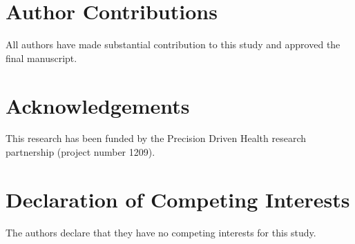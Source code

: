 \documentclass{elsarticle}
\begin{document}
\section*{Author Contributions}
All authors have made substantial contribution to this study and approved the final manuscript.

\section*{Acknowledgements}
This research has been funded by the Precision Driven Health research partnership (project number 1209).

\section*{Declaration of Competing Interests}
The authors declare that they have no competing interests for this study.


\end{document}

